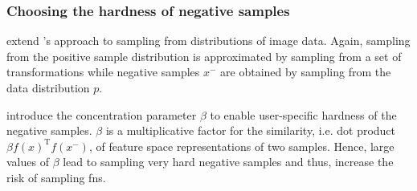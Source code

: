 \newpage
\subsubsection{Choosing the hardness of negative samples}\label{subsec:choose_hardness}

\citet{robinson_contrastive_2021} 
extend \citet{chuang_debiased_2020}'s approach to sampling from distributions of image data.
Again, sampling from the positive sample distribution is approximated by sampling from a set of transformations
while negative samples $x^-$ are obtained by sampling from the data distribution $p$.

\citet{robinson_contrastive_2021} introduce the concentration parameter $\beta$ 
to enable user-specific hardness of the negative samples.
$\beta$ is a multiplicative factor for the similarity, i.e. dot product $\beta f(x)^\text{T}f(x^-)$, 
of feature space representations of two samples.
Hence, large values of $\beta$ lead to sampling very hard negative samples and thus, 
increase the risk of sampling \acp{fn}.